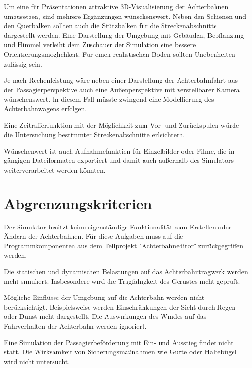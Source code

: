 Um eine für Präsentationen attraktive 3D-Visualisierung der Achterbahnen umzusetzen, sind mehrere Ergänzungen wünschenswert. Neben den Schienen und den Querbalken sollten auch die Stützbalken für die Streckenabschnitte dargestellt werden. Eine Darstellung der Umgebung mit Gebäuden, Bepflanzung und Himmel verleiht dem Zuschauer der Simulation eine bessere Orientierungsmöglichkeit. Für einen realistischen Boden sollten Unebenheiten zulässig sein.

Je nach Rechenleistung wäre neben einer Darstellung der Achterbahnfahrt aus der Passagierperspektive auch eine Außenperspektive mit verstellbarer Kamera wünschenswert. In diesem Fall müsste zwingend eine Modellierung des Achterbahnwagens erfolgen.

Eine Zeitrafferfunktion mit der Möglichkeit zum Vor- und Zurückspulen würde die Untersuchung bestimmter Streckenabschnitte erleichtern.

Wünschenwert ist auch Aufnahmefunktion für Einzelbilder oder Filme, die in gängigen Dateiformaten exportiert und damit auch außerhalb des Simulators weiterverarbeitet werden könnten.

\section{Abgrenzungskriterien}
Der Simulator besitzt keine eigenständige Funktionalität zum Erstellen oder Ändern der Achterbahnen. Für diese Aufgaben muss auf die Programmkomponenten aus dem Teilprojekt "Achterbahneditor" zurückgegriffen werden.

Die statischen und dynamischen Belastungen auf das Achterbahntragwerk werden nicht simuliert. Insbesondere wird die Tragfähigkeit des Gerüstes nicht geprüft.

Mögliche Einflüsse der Umgebung auf die Achterbahn werden nicht berücksichtigt. Beispielsweise werden Einschränkungen der Sicht durch Regen- oder Dunst nicht dargestellt. Die Auswirkungen des Windes auf das Fahrverhalten der Achterbahn werden ignoriert.

Eine Simulation der Passagierbeförderung mit Ein- und Ausstieg findet nicht statt. Die Wirksamkeit von Sicherungsmaßnahmen wie Gurte oder Haltebügel wird nicht untersucht. 